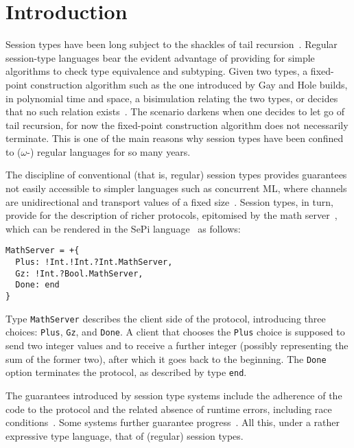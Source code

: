 \section{Introduction}

Session types have been long subject to the shackles of tail
recursion~\cite{DBLP:conf/concur/Honda93,DBLP:conf/esop/HondaVK98}. Regular
session-type languages bear the evident advantage of providing for
simple algorithms to check type equivalence and subtyping. Given two
types, a fixed-point construction algorithm such as the one introduced
by Gay and Hole builds, in polynomial time and space, a bisimulation
relating the two types, or decides that no such relation
exists~\cite{DBLP:journals/acta/GayH05}. The scenario darkens when one
decides to let go of tail recursion, for now the fixed-point
construction algorithm does not necessarily terminate.
%
This is one of the main reasons why session types have been confined
to ($\omega$-) regular languages for so many years.

The discipline of conventional (that is, regular) session types
provides guarantees not easily accessible to simpler languages such as
concurrent ML, where channels are unidirectional and transport values
of a fixed size~\cite{DBLP:conf/mcmaster/Reppy93}. Session types, in
turn, provide for the description of richer protocols, epitomised by
the math server~\cite{DBLP:journals/acta/GayH05}, which can be
rendered in the SePi language~\cite{DBLP:conf/sefm/FrancoV13} as
follows:
%
\begin{lstlisting}[morekeywords=end]
MathServer = +{
  Plus: !Int.!Int.?Int.MathServer,
  Gz: !Int.?Bool.MathServer,
  Done: end
}
\end{lstlisting}

Type \lstinline|MathServer| describes the client side of the protocol,
introducing three choices: \lstinline|Plus|, \lstinline|Gz|, and
\lstinline|Done|. A client that chooses the \lstinline|Plus| choice is
supposed to send two integer values and to receive a further integer
(possibly representing the sum of the former two), after which it goes
back to the beginning. The \lstinline|Done| option terminates the
protocol, as described by type \lstinline[morekeywords=end]|end|.

The guarantees introduced by session type systems include the
adherence of the code to the protocol and the related absence of
runtime errors, including race
conditions~\cite{DBLP:conf/esop/HondaVK98}. Some systems further
guarantee progress~\cite{DBLP:conf/concur/CairesP10}. All this, under
a rather expressive type language, that of (regular) session types.

